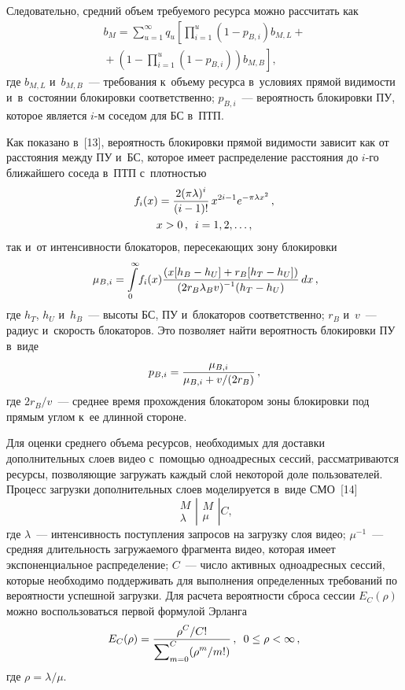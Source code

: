 \begin{multicols}{2}
  Следовательно, средний объем требуемого ресурса можно рассчитать как
  \begin{multline}
  b_M= \sum\limits^\infty_{u=1} q_u\left[ \prod\limits^u_{i=1} \left(1-
p_{B,i}\right) b_{M,L} +{}\right.\\
\left.{}+\left( 1-\prod\limits^u_{i=1} \left(1-p_{B,i}\right)\right) 
b_{M,B}\right],
  \label{e5-bes}
  \end{multline}
где $b_{M,L}$ и~$b_{M,B}$~--- требования к~объему ресурса в~условиях 
прямой видимости и~в~состоянии блокировки соответственно;  $p_{B,i}$~--- 
вероятность блокировки ПУ, которое является $i$-м соседом для БС в~ПТП.

  Как показано в~[13], вероятность блокировки прямой видимости зависит как 
от расстояния между ПУ и~БС, которое имеет распределение расстояния до  
$i$-го ближайшего соседа в~ПТП с~плот\-ностью
  \begin{multline}
  f_i(x)=\displaystyle\frac{\displaystyle 2(\pi\lambda)^i\mathstrut}{\displaystyle (i-1)!\mathstrut}\,x^{2i-1} e^{-\pi\lambda x^2}\,,\\
   x>0\,,\enskip  i=1,2,\ldots,
  \label{e5-1.bes}
  \end{multline}
так и~от интенсивности блокаторов, пересекающих зону блокировки
\begin{equation}
\mu_{B,i}= \int\limits_0^\infty\! f_i(x) \displaystyle\frac{\displaystyle (x[h_B -h_U] +r_B [h_T-h_U])\mathstrut}{\displaystyle (2r_B\lambda_B v)^{-1} (h_T- h_U)\mathstrut}\,dx\,,\!
\label{e6-bes}
\end{equation}
где $h_T$, $h_U$ и~$h_B$~--- высоты БС, ПУ и~блокаторов соответственно; 
$r_B$ и~$v$~--- радиус и~скорость блокаторов. Это позволяет найти 
вероятность блокировки ПУ в~виде
\begin{equation}
p_{B,i}= \displaystyle\frac{\displaystyle \mu_{B,i}\mathstrut}{\displaystyle \mu_{B,i}+v/(2r_B)\mathstrut}\,,
\label{e7-bes}
\end{equation}
где $2r_B/v$~--- среднее время прохождения блокатором зоны блокировки под 
прямым углом к~ее длинной стороне.
  
  Для оценки среднего объема ресурсов, необходимых для доставки 
дополнительных слоев видео с~по\-мощью одноадресных сессий, 
рассматриваются ресурсы, позволяющие загружать каждый слой некоторой 
доле пользователей. Процесс загрузки дополнительных слоев моделируется 
в~виде СМО~[14] 
$$
\begin{matrix} M \\ \lambda\end{matrix} \left\vert \begin{matrix} M 
\\ \mu\end{matrix}\right\vert C,
$$ 
где $\lambda$~--- интенсивность 
поступления запросов на загрузку слоя видео; $\mu^{-1}$~--- средняя 
длительность загружаемого фрагмента видео, которая имеет экспоненциальное 
распределение;  $C$~--- чис\-ло активных одноадресных сессий, которые 
необходимо поддерживать для выполнения определенных требований по 
вероятности успешной загрузки. Для расчета вероятности сброса сессии 
$E_C(\rho)$ можно воспользоваться первой формулой Эрланга
  \begin{equation*}
  E_C(\rho)=\displaystyle\frac{\displaystyle \rho^C/C!\mathstrut}{\displaystyle \sum\nolimits^C_{m=0} (\rho^m/m!)\mathstrut}\,,\enskip 
0\leq\rho < \infty\,,
  \end{equation*}
где $\rho=\lambda/\mu$. 
  

\end{multicols}
